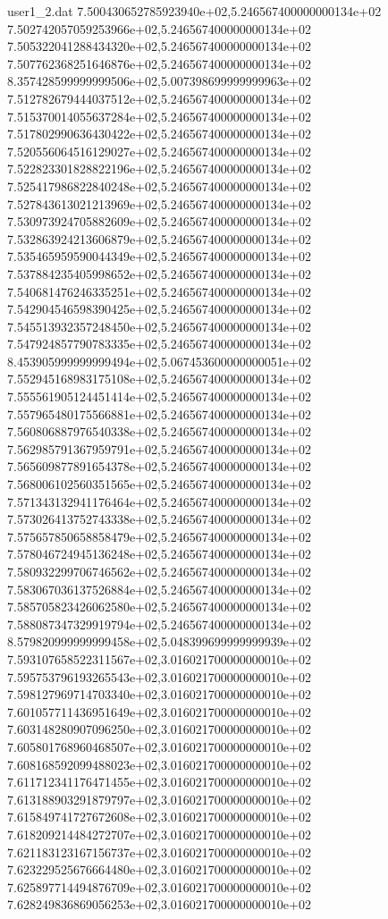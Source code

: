 \begin{filecontents}{user1_2.dat}
7.500430652785923940e+02,5.246567400000000134e+02
7.502742057059253966e+02,5.246567400000000134e+02
7.505322041288434320e+02,5.246567400000000134e+02
7.507762368251646876e+02,5.246567400000000134e+02
8.357428599999999506e+02,5.007398699999999963e+02
7.512782679444037512e+02,5.246567400000000134e+02
7.515370014055637284e+02,5.246567400000000134e+02
7.517802990636430422e+02,5.246567400000000134e+02
7.520556064516129027e+02,5.246567400000000134e+02
7.522823301828822196e+02,5.246567400000000134e+02
7.525417986822840248e+02,5.246567400000000134e+02
7.527843613021213969e+02,5.246567400000000134e+02
7.530973924705882609e+02,5.246567400000000134e+02
7.532863924213606879e+02,5.246567400000000134e+02
7.535465959590044349e+02,5.246567400000000134e+02
7.537884235405998652e+02,5.246567400000000134e+02
7.540681476246335251e+02,5.246567400000000134e+02
7.542904546598390425e+02,5.246567400000000134e+02
7.545513932357248450e+02,5.246567400000000134e+02
7.547924857790783335e+02,5.246567400000000134e+02
8.453905999999999494e+02,5.067453600000000051e+02
7.552945168983175108e+02,5.246567400000000134e+02
7.555561905124451414e+02,5.246567400000000134e+02
7.557965480175566881e+02,5.246567400000000134e+02
7.560806887976540338e+02,5.246567400000000134e+02
7.562985791367959791e+02,5.246567400000000134e+02
7.565609877891654378e+02,5.246567400000000134e+02
7.568006102560351565e+02,5.246567400000000134e+02
7.571343132941176464e+02,5.246567400000000134e+02
7.573026413752743338e+02,5.246567400000000134e+02
7.575657850658858479e+02,5.246567400000000134e+02
7.578046724945136248e+02,5.246567400000000134e+02
7.580932299706746562e+02,5.246567400000000134e+02
7.583067036137526884e+02,5.246567400000000134e+02
7.585705823426062580e+02,5.246567400000000134e+02
7.588087347329919794e+02,5.246567400000000134e+02
8.579820999999999458e+02,5.048399699999999939e+02
7.593107658522311567e+02,3.016021700000000010e+02
7.595753796193265543e+02,3.016021700000000010e+02
7.598127969714703340e+02,3.016021700000000010e+02
7.601057711436951649e+02,3.016021700000000010e+02
7.603148280907096250e+02,3.016021700000000010e+02
7.605801768960468507e+02,3.016021700000000010e+02
7.608168592099488023e+02,3.016021700000000010e+02
7.611712341176471455e+02,3.016021700000000010e+02
7.613188903291879797e+02,3.016021700000000010e+02
7.615849741727672608e+02,3.016021700000000010e+02
7.618209214484272707e+02,3.016021700000000010e+02
7.621183123167156737e+02,3.016021700000000010e+02
7.623229525676664480e+02,3.016021700000000010e+02
7.625897714494876709e+02,3.016021700000000010e+02
7.628249836869056253e+02,3.016021700000000010e+02

\end{filecontents}
